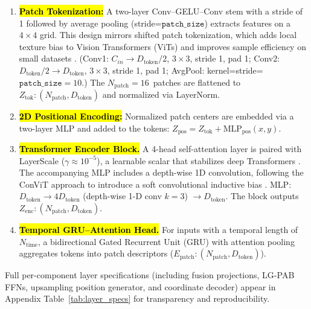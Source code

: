 \documentclass[remotesensing,article,accept,pdftex,moreauthors]{Definitions/mdpi}
\begin{document}
\begin{enumerate}[leftmargin=*]
\item \textbf{\hl{Patch Tokenization:}}
      A two-layer Conv–GELU–Conv stem with a stride of 1 %
      followed by average pooling (stride=$\texttt{patch\_size}$) extracts features on a $4\times4$ grid. This design mirrors shifted patch tokenization, which adds local texture bias to Vision Transformers (ViTs) and improves sample efficiency on small datasets \cite{lee2021vision}.
 (Conv1: $C_{in}\rightarrow D_{\text{token}}/2$, $3\times3$, stride 1, pad 1; Conv2: $D_{\text{token}}/2\rightarrow D_{\text{token}}$, $3\times3$, stride 1, pad 1; AvgPool: kernel=stride=$\texttt{patch\_size}=10$.) The \mbox{$N_{\text{patch}}=16$ patches} are flattened to $Z_{\text{tok}}: (N_{\text{patch}}, D_{\text{token}})$ and normalized via LayerNorm.


\item \textbf{\hl{2D Positional Encoding:}}
      Normalized patch centers are embedded via a two-layer MLP and added to the tokens: $Z_{\text{pos}} = Z_{\text{tok}} + \text{MLP}_{\text{pos}}(x,y)$.

\item \textbf{\hl{Transformer Encoder Block.}}
      A 4-head self-attention layer is paired with LayerScale ($\gamma \approx 10^{-5}$), a learnable scalar that stabilizes deep Transformers \cite{touvron2021going}. The accompanying MLP includes a depth-wise 1D convolution, following the ConViT approach to introduce a soft convolutional inductive bias \cite{dascoli2021convit}. MLP: $D_{\text{token}} \rightarrow 4 D_{\text{token}}$ (depth-wise 1-D conv $k=3$) $\rightarrow D_{\text{token}}$. The block outputs $Z_{\text{enc}}: (N_{\text{patch}}, D_{\text{token}})$.



\item \textbf{\hl{Temporal GRU–Attention Head.}}
      For inputs with a temporal length of $N_{\text{time}}$, a bidirectional Gated Recurrent Unit (GRU) with attention pooling aggregates tokens into patch descriptors ($E_{\text{patch}}: (N_{\text{patch}}, D_{\text{token}})$).
\end{enumerate}

Full per-component layer specifications (including fusion projections, LG-PAB FFNs, upsampling position generator, and coordinate decoder) appear in Appendix Table~\ref{tab:layer_specs} for transparency and reproducibility.
\end{document}
